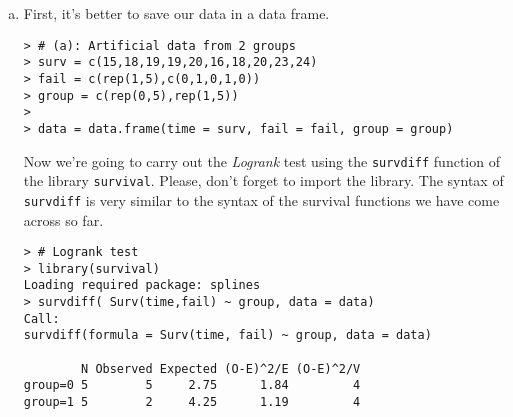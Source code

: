 \begin{enumerate}[(a)]
\item First, it's better to save our data in a data frame.
\begin{footnotesize}
\begin{verbatim}
> # (a): Artificial data from 2 groups
> surv = c(15,18,19,19,20,16,18,20,23,24)
> fail = c(rep(1,5),c(0,1,0,1,0))
> group = c(rep(0,5),rep(1,5))
> 
> data = data.frame(time = surv, fail = fail, group = group)
\end{verbatim}
\end{footnotesize}
Now we're going to carry out the \emph{Logrank} test using the \verb|survdiff| function of the library \verb|survival|. Please, don't forget to import the library. The syntax of \verb|survdiff| is very similar to the syntax of the survival functions we have come across so far. 
\begin{footnotesize}
\begin{verbatim}
> # Logrank test
> library(survival)
Loading required package: splines
> survdiff( Surv(time,fail) ~ group, data = data)
Call:
survdiff(formula = Surv(time, fail) ~ group, data = data)

        N Observed Expected (O-E)^2/E (O-E)^2/V
group=0 5        5     2.75      1.84         4
group=1 5        2     4.25      1.19         4


\end{verbatim}
\end{footnotesize}
\end{enumerate}
